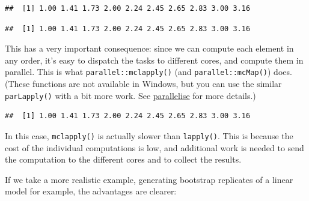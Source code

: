 \begin{verbatim}
##  [1] 1.00 1.41 1.73 2.00 2.24 2.45 2.65 2.83 3.00 3.16
\end{verbatim}

\begin{Shaded}
\begin{Highlighting}[]
\NormalTok{(}\NormalTok{(}\OperatorTok{:}
\end{Highlighting}
\end{Shaded}

\begin{verbatim}
##  [1] 1.00 1.41 1.73 2.00 2.24 2.45 2.65 2.83 3.00 3.16
\end{verbatim}

This has a very important consequence: since we can compute each element
in any order, it's easy to dispatch the tasks to different cores, and
compute them in parallel. This is what \texttt{parallel::mclapply()}
(and \texttt{parallel::mcMap()}) does. (These functions are not
available in Windows, but you can use the similar \texttt{parLapply()}
with a bit more work. See \protect\hyperlink{parallelise}{parallelise}
for more details.) 

\begin{Shaded}
\begin{Highlighting}[]
\NormalTok{(}\NormalTok{(}\OperatorTok{:} \NormalTok{))}
\end{Highlighting}
\end{Shaded}

\begin{verbatim}
##  [1] 1.00 1.41 1.73 2.00 2.24 2.45 2.65 2.83 3.00 3.16
\end{verbatim}

In this case, \texttt{mclapply()} is actually slower than
\texttt{lapply()}. This is because the cost of the individual
computations is low, and additional work is needed to send the
computation to the different cores and to collect the results.

If we take a more realistic example, generating bootstrap replicates of
a linear model for example, the advantages are clearer:


